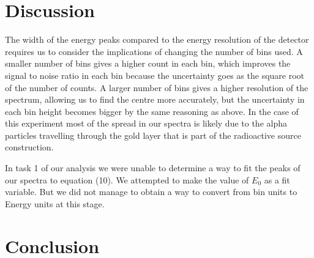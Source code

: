 \documentclass[a4paper]{article}
\begin{document}
\newpage
\begin{multicols}{2}
\section{Discussion}
The width of the energy peaks compared to the energy resolution of the detector requires us to consider the implications of changing the number of bins used. A smaller number of bins gives a higher count in each bin, which improves the signal to noise ratio in each bin because the uncertainty goes as the square root of the number of counts.
A larger number of bins gives a higher resolution of the spectrum, allowing us to find the centre more accurately, but the uncertainty in each bin height becomes bigger by the same reasoning as above.\cite{feedback}
In the case of this experiment most of the spread in our spectra is likely due to the alpha particles travelling through the gold layer that is part of the radioactive source construction. 

In task 1 of our analysis we were unable to determine a way to fit the peaks of our spectra to equation (10). We attempted to make the value of $E_0$ as a fit variable. But we did not manage to obtain a way to convert from bin units to Energy units at this stage.


\section{Conclusion}



\end{multicols}


\end{document}
